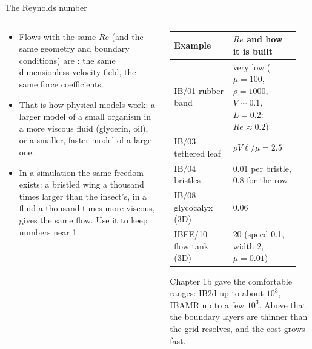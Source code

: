 \documentclass[aspectratio=169,11pt]{beamer}
\begin{document}
\begin{frame}{The Reynolds number}
\begin{columns}[T,onlytextwidth]
\begin{column}{0.55\textwidth}
\begin{itemize}
  \item Flows with the same $Re$ (and the same geometry and boundary conditions) are : the same dimensionless velocity field, the same force coefficients.
  \item That is how physical models work: a larger model of a small organism in a more viscous fluid (glycerin, oil), or a smaller, faster model of a large one.
  \item In a simulation the same freedom exists: a bristled wing a thousand times larger than the insect's, in a fluid a thousand times more viscous, gives the same flow. Use it to keep numbers near 1.
\end{itemize}
\end{column}
\begin{column}{0.43\textwidth}
\scriptsize
\begin{tabular}{@{}L{0.42\linewidth}L{0.48\linewidth}@{}}
\toprule
Example & $Re$ and how it is built\\
\midrule
IB/01 rubber band & very low ($\mu = 100$, $\rho = 1000$, $V\sim0.1$, $L = 0.2$: $Re \approx 0.2$)\\
IB/03 tethered leaf & $\rho V \ell/\mu = 2.5$\\
IB/04 bristles & 0.01 per bristle, 0.8 for the row\\
IB/08 glycocalyx (3D) & 0.06\\
IBFE/10 flow tank (3D) & 20 (speed 0.1, width 2, $\mu = 0.01$)\\
\bottomrule
\end{tabular}
\vspace{2mm}
\begin{punchbox}
\small Chapter 1b gave the comfortable ranges: IB2d up to about $10^3$, IBAMR up to a few $10^3$. Above that the boundary layers are thinner than the grid resolves, and the cost grows fast.
\end{punchbox}
\end{column}
\end{columns}
\end{frame}
\end{document}
